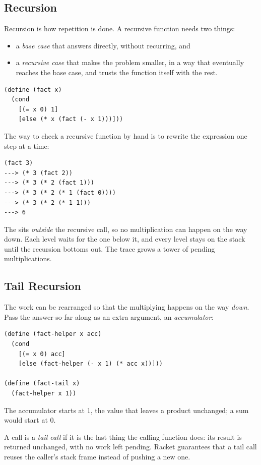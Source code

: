 \subsection{Recursion}

Recursion is how repetition is done. A recursive function needs two things:
\begin{itemize}
  \item a \emph{base case} that answers directly, without recurring, and
  \item a \emph{recursive case} that makes the problem smaller, in a way that eventually reaches the base case, and trusts the function itself with the rest.
\end{itemize}

\begin{lstlisting}
(define (fact x)
  (cond
    [(= x 0) 1]
    [else (* x (fact (- x 1)))]))
\end{lstlisting}

The way to check a recursive function by hand is to rewrite the expression one step at a time:
\begin{lstlisting}[style=repl]
(fact 3)
---> (* 3 (fact 2))
---> (* 3 (* 2 (fact 1)))
---> (* 3 (* 2 (* 1 (fact 0))))
---> (* 3 (* 2 (* 1 1)))
---> 6
\end{lstlisting}

The \code{*} sits \emph{outside} the recursive call, so no multiplication can happen on the way down. Each level waits for the one below it, and every level stays on the stack until the recursion bottoms out. The trace grows a tower of pending multiplications.

\subsection{Tail Recursion}

The work can be rearranged so that the multiplying happens on the way \emph{down}. Pass the answer-so-far along as an extra argument, an \emph{accumulator}:

\begin{lstlisting}
(define (fact-helper x acc)
  (cond
    [(= x 0) acc]
    [else (fact-helper (- x 1) (* acc x))]))

(define (fact-tail x)
  (fact-helper x 1))
\end{lstlisting}

The accumulator starts at 1, the value that leaves a product unchanged; a sum would start at 0.

\begin{definition}
A call is a \emph{tail call} if it is the last thing the calling function does: its result is returned unchanged, with no work left pending. Racket guarantees that a tail call reuses the caller's stack frame instead of pushing a new one.
\end{definition}

